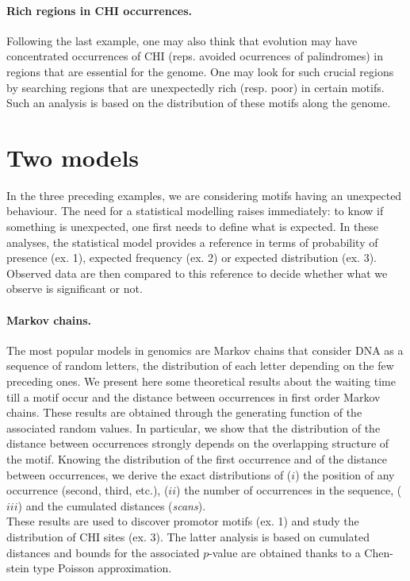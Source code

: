 \documentclass[11pt,a4paper,french]{article}
\begin{document}
\paragraph{Rich regions in CHI occurrences.}
Following the last example, one may also think that evolution may have
concentrated occurrences of CHI (reps. avoided ocurrences of
palindromes) in regions that are essential for the genome. One may
look for such crucial regions by searching regions that are
unexpectedly rich (resp. poor) in certain motifs. Such an analysis is
based on the distribution of these motifs along the genome.

\section*{Two models}

In the three preceding examples, we are considering motifs having an
unexpected behaviour. The need for a statistical modelling raises
immediately: to know if something is unexpected, one first needs to
define what is expected.  In these analyses, the statistical model
provides a reference in terms of probability of presence (ex. 1),
expected frequency (ex. 2) or expected distribution (ex. 3). Observed
data are then compared to this reference to decide whether what we
observe is significant or not.

\paragraph{Markov chains.}
The most popular models in genomics are Markov chains that consider
DNA as a sequence of random letters, the distribution of each letter
depending on the few preceding ones.  We present here some theoretical
results about the waiting time till a motif occur and the distance
between occurrences in first order Markov chains. These results are
obtained through the generating function of the associated random
values. In particular, we show that the distribution of the distance
between occurrences strongly depends on the overlapping structure of
the motif.  Knowing the distribution of the first occurrence and of
the distance between occurrences, we derive the exact distributions of
($i$) the position of any occurrence (second, third, etc.), ($ii$) the
number of occurrences in the sequence, ($iii$) and the cumulated
distances ({\em scans}). \\
These results are used to discover promotor motifs (ex. 1) and study
the distribution of CHI sites (ex. 3). The latter analysis is based on
cumulated distances and bounds for the associated $p$-value are
obtained thanks to a Chen-stein type Poisson approximation.
\end{document}

